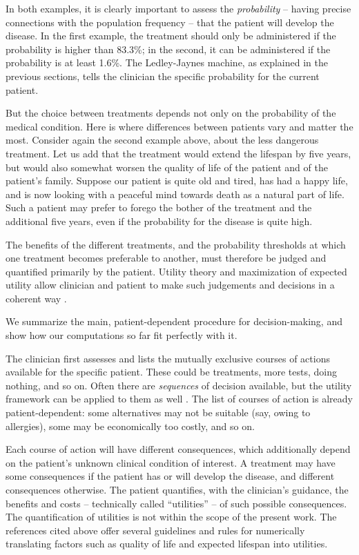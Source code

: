 \documentclass[utf8]{FrontiersinHarvard} %
\renewcommand*{\|}[1][]{\nonscript\:#1\vert\nonscript\:\mathopen{}}
\newcommand*{\ljm}{Ledley-Jaynes machine}
\begin{document}
In both examples, it is clearly important to assess the \emph{probability} -- having precise connections with the population frequency -- that the patient will develop the disease. In the first example, the treatment should only be administered if the probability is higher than 83.3\%; in the second, it can be administered if the probability is at least 1.6\%. The \ljm, as explained in the previous sections, tells the clinician the specific probability for the current patient.

But the choice between treatments depends not only on the probability of the medical condition. Here is where differences between patients vary and matter the most. Consider again the second example above, about the less dangerous treatment. Let us add that the treatment would extend the lifespan by five years, but would also somewhat worsen the quality of life of the patient and of the patient's family. Suppose our patient is quite old and tired, has had a happy life, and is now looking with a peaceful mind towards death as a natural part of life. Such a patient may prefer to forego the bother of the treatment and the additional five years, even if the probability for the disease is quite high.

The benefits of the different treatments, and the probability thresholds at which one treatment becomes preferable to another, must therefore be judged and quantified primarily by the patient. Utility theory and maximization of expected utility allow clinician and patient to make such judgements and decisions in a coherent way \citetext{\citealt{soxetal1988_r2013,huninketal2001_r2014}; see also the clear and charming exposition by \citealt{lindley1971_r1988}, and \citealt{ohaganetal2006}}.

We summarize the main, patient-dependent procedure for decision-making, and show how our computations so far fit perfectly with it.

The clinician first assesses and lists the mutually exclusive courses of actions available for the specific patient. These could be treatments, more tests, doing nothing, and so on. Often there are \emph{sequences} of decision available, but the utility framework can be applied to them as well \citep[see references above and][]{raiffa1968_r1970}. The list of courses of action is already patient-dependent: some alternatives may not be suitable (say, owing to allergies), some may be economically too costly, and so on.

Each course of action will have different consequences, which additionally depend on the patient's unknown clinical condition of interest. A treatment may have some consequences if the patient has or will develop the disease, and different consequences otherwise. The patient quantifies, with the clinician's guidance, the benefits and costs -- technically called \enquote{utilities} -- of such possible consequences. The quantification of utilities is not within the scope of the present work. The references cited above offer several guidelines and rules for numerically translating factors such as quality of life and expected lifespan into utilities.
\end{document}
